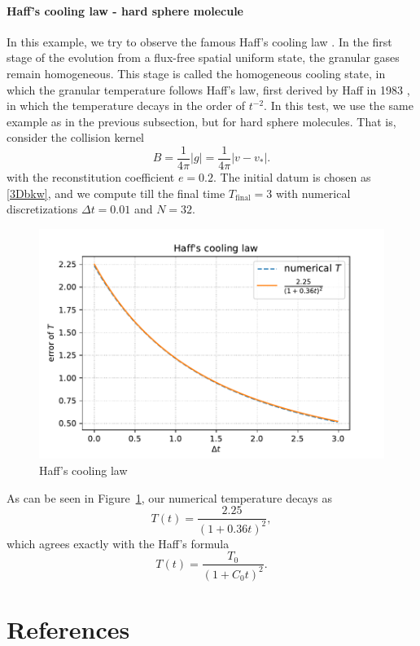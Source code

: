 \documentclass[review, times]{elsarticle}
\begin{document}
\paragraph{\bf Haff's cooling law - hard sphere molecule}
In this example, we try to observe the famous Haff's cooling law \cite{haff1983}. In the first stage of the evolution from a flux-free spatial uniform state, the granular gases remain homogeneous. This stage is called the homogeneous cooling state, in which the granular temperature follows Haff's law, first derived by Haff in 1983 \cite{haff1983, oxfordbook}, in which the temperature decays in the order of $t^{-2}$.
In this test, we use the same example as in the previous subsection, but for hard sphere molecules. That is, consider the collision kernel
\begin{equation}
  B = \frac{1}{4\pi}|g| = \frac{1}{4\pi}|v-v_\ast|.
\end{equation}
with the reconstitution coefficient $ e = 0.2$. The initial datum is chosen as \eqref{3Dbkw}, and we compute till the final time $T_\text{final} = 3$ with numerical discretizations $\Delta t = 0.01$ and $N = 32$.
\begin{figure}[H]
  \centering
  \includegraphics[width = .8\linewidth]{figs/Haff's_cooling}
  \caption{Haff's cooling law}
  \label{Haff_cooling}
\end{figure}
As can be seen in Figure~\ref{Haff_cooling}, our numerical temperature decays as 
$$ T(t) = \frac{2.25}{ (1+0.36t)^2},$$
which agrees exactly with the Haff's formula $$T(t) = \frac{T_0}{(1+C_0 t)^2}.$$


\section*{References}


\end{document}
